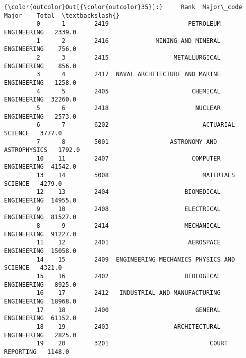 \documentclass[11pt]{article}
\begin{document}
\begin{Verbatim}[commandchars=\\\{\}]
{\color{outcolor}Out[{\color{outcolor}35}]:}     Rank  Major\_code                                      Major    Total  \textbackslash{}
         0      1        2419                      PETROLEUM ENGINEERING   2339.0   
         1      2        2416             MINING AND MINERAL ENGINEERING    756.0   
         2      3        2415                  METALLURGICAL ENGINEERING    856.0   
         3      4        2417  NAVAL ARCHITECTURE AND MARINE ENGINEERING   1258.0   
         4      5        2405                       CHEMICAL ENGINEERING  32260.0   
         5      6        2418                        NUCLEAR ENGINEERING   2573.0   
         6      7        6202                          ACTUARIAL SCIENCE   3777.0   
         7      8        5001                 ASTRONOMY AND ASTROPHYSICS   1792.0   
         10    11        2407                       COMPUTER ENGINEERING  41542.0   
         13    14        5008                          MATERIALS SCIENCE   4279.0   
         12    13        2404                     BIOMEDICAL ENGINEERING  14955.0   
         9     10        2408                     ELECTRICAL ENGINEERING  81527.0   
         8      9        2414                     MECHANICAL ENGINEERING  91227.0   
         11    12        2401                      AEROSPACE ENGINEERING  15058.0   
         14    15        2409  ENGINEERING MECHANICS PHYSICS AND SCIENCE   4321.0   
         15    16        2402                     BIOLOGICAL ENGINEERING   8925.0   
         16    17        2412   INDUSTRIAL AND MANUFACTURING ENGINEERING  18968.0   
         17    18        2400                        GENERAL ENGINEERING  61152.0   
         18    19        2403                  ARCHITECTURAL ENGINEERING   2825.0   
         19    20        3201                            COURT REPORTING   1148.0   
         

\end{Verbatim}
\end{document}

